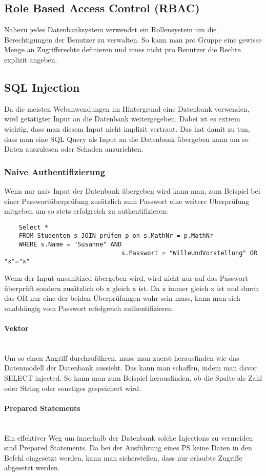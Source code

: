 \documentclass{article}
\newcommand{\paragraphlb}[1]{\paragraph{#1}\mbox{}\\}
\begin{document}
	\subsection{Role Based Access Control (RBAC)}
	Nahezu jedes Datenbanksystem verwendet ein Rollensystem um die Berechtigungen der Benutzer zu verwalten. So kann man pro Gruppe eine gewisse Menge an Zugriffsrechte definieren und muss nicht pro Benutzer die Rechte explizit angeben.
	\subsection{SQL Injection}
	Da die meisten Webanwendungen im Hintergrund eine Datenbank verwenden, wird getätigter Input an die Datenbank weitergegeben. Dabei ist es extrem wichtig, dass man diesem Input nicht implizit vertraut. Das hat damit zu tun, dass man eine SQL Query als Input an die Datenbank übergeben kann um so Daten auszulesen oder Schaden anzurichten.
	\subsubsection{Naive Authentifizierung}
	Wenn nur naiv Input der Datenbank übergeben wird kann man, zum Beispiel bei einer Passwortüberprüfung zusätzlich zum Passwort eine weitere Überprüfung mitgeben um so stets erfolgreich zu authentifizieren:
	\begin{verbatim}
	Select *
	FROM Studenten s JOIN prüfen p on s.MathNr = p.MathNr 
	WHERE s.Name = "Susanne" AND
								s.Passwort = "WilleUndVorstellung" OR "x"="x"
	\end{verbatim}
	Wenn der Input unsanitized übergeben wird, wird nicht nur auf das Passwort überprüft sondern zusätzlich ob x gleich x ist. Da x immer gleich x ist und durch das OR nur eine der beiden Überprüfungen wahr sein muss, kann man sich unabhängig vom Passwort erfolgreich authentifizieren.
	\paragraphlb{Vektor}
	Um so einen Angriff durchzuführen, muss man zuerst herausfinden wie das Datenmodell der Datenbank aussieht. Das kann man schaffen, indem man davor SELECT injected. So kann man zum Beispiel herausfinden, ob die Spalte als Zahl oder String oder sonstiges gespeichert wird.
	\paragraphlb{Prepared Statements}
	Ein effektiver Weg um innerhalb der Datenbank solche Injections zu vermeiden sind Prepared Statements. Da bei der Ausführung eines PS keine Daten in den Befehl eingesetzt werden, kann man sicherstellen, dass nur erlaubte Zugriffe abgesetzt werden.
\end{document}
